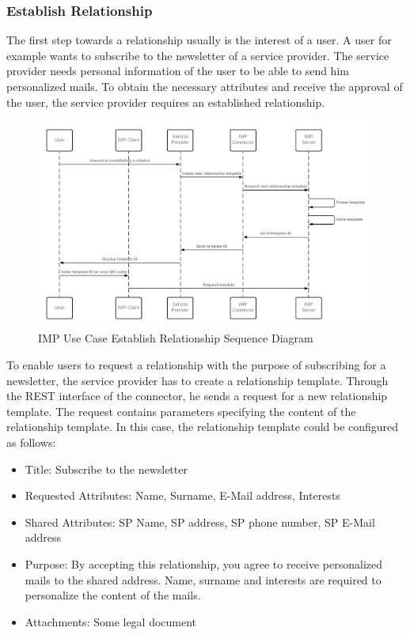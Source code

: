 \subsubsection{Establish Relationship}

The first step towards a relationship usually is the interest of a user. A user for example wants to subscribe to the newsletter of a service provider. The service provider needs personal information of the user to be able to send him personalized mails. To obtain the necessary attributes and receive the approval of the user, the service provider requires an established relationship.

\begin{figure}[h]
    \centering
    \caption{IMP Use Case Establish Relationship Sequence Diagram}
    \includegraphics[scale=0.3]{Diagrams/IMP Use Case Establish Relationship Sequence Diagram 1.png}
\end{figure}

To enable users to request a relationship with the purpose of subscribing for a newsletter, the service provider has to create a relationship template. Through the REST interface of the connector, he sends a request for a new relationship template. The request contains parameters specifying the content of the relationship template. In this case, the relationship template could be configured as follows:

\begin{itemize}
    \item Title: Subscribe to the newsletter
    \item Requested Attributes: Name, Surname, E-Mail address, Interests
    \item Shared Attributes: SP Name, SP address, SP phone number, SP E-Mail address
    \item Purpose: By accepting this relationship, you agree to receive personalized mails to the shared address. Name, surname and interests are required to personalize the content of the mails.
    \item Attachments: Some legal document
\end{itemize}

